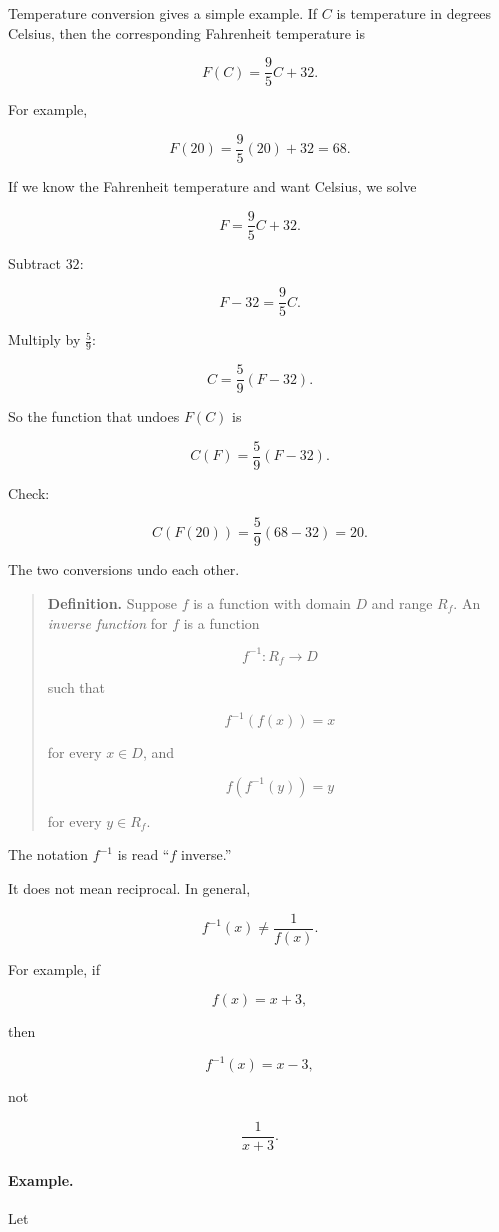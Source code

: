Temperature conversion gives a simple example. If \(C\) is temperature in degrees Celsius, then the corresponding Fahrenheit temperature is

\[
F(C)=\frac95 C+32.
\]

For example,

\[
F(20)=\frac95(20)+32=68.
\]

If we know the Fahrenheit temperature and want Celsius, we solve

\[
F=\frac95 C+32.
\]

Subtract \(32\):

\[
F-32=\frac95 C.
\]

Multiply by \(\frac59\):

\[
C=\frac59(F-32).
\]

So the function that undoes \(F(C)\) is

\[
C(F)=\frac59(F-32).
\]

Check:

\[
C(F(20))
=
\frac59(68-32)
=
20.
\]

The two conversions undo each other.

\begin{quote}
\textbf{Definition.}
Suppose \(f\) is a function with domain \(D\) and range \(R_f\). An \emph{inverse function} for \(f\) is a function

\[
f^{-1}:R_f\to D
\]

such that

\[
f^{-1}(f(x))=x
\]

for every \(x\in D\), and

\[
f(f^{-1}(y))=y
\]

for every \(y\in R_f\).
\end{quote}

The notation \(f^{-1}\) is read ``\(f\) inverse.''

It does not mean reciprocal. In general,

\[
f^{-1}(x)\neq \frac{1}{f(x)}.
\]

For example, if

\[
f(x)=x+3,
\]

then

\[
f^{-1}(x)=x-3,
\]

not

\[
\frac{1}{x+3}.
\]

\paragraph{Example.}
Let


